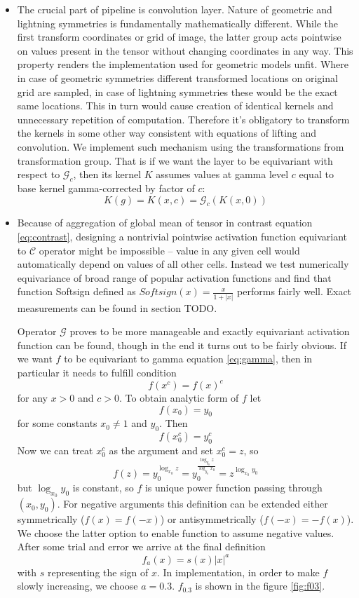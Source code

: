 \begin{itemize}
\item
The crucial part of pipeline is convolution layer. Nature of geometric
and lightning symmetries is fundamentally mathematically different. While
the first
transform coordinates or grid of image, the latter group acts pointwise on
values present in the tensor without changing coordinates in any way.
This property renders the implementation used for geometric models unfit.
Where in case of geometric symmetries different transformed locations
on original grid are sampled, in case of lightning symmetries these would be the
exact same locations. This in turn would cause creation of identical kernels and
unnecessary repetition of computation. Therefore it's obligatory to transform the
kernels in some other way consistent with equations of lifting and convolution.
We implement such mechanism using the transformations from transformation group.
That is if we want the layer to be equivariant with respect to
$\mathcal{G}_c$, then its kernel $K$ assumes values at gamma level $c$ equal to
base kernel gamma-corrected by factor of $c$:
\begin{equation}
    K(g) = K(x,c) = \mathcal{G}_c(K(x,0))
\end{equation}

\item Because of aggregation of global mean of tensor in contrast equation \ref{eq:contrast},
    designing a nontrivial pointwise activation function equivariant to
    $\mathcal{C}$ operator
    might be impossible -- value in any given cell would automatically depend on
    values of all other cells. Instead we test numerically equivariance of broad
    range of popular activation functions and find that function Softsign
    defined as $\mathit{Softsign}(x) = \frac{x}{1+|x|}$ performs fairly well.
    Exact measurements can be found in section TODO.

    Operator $\mathcal{G}$ proves to be more manageable and exactly equivariant
    activation function can be found, though in the end it turns out to be
    fairly obvious. If we want $f$ to be equivariant to gamma equation \ref{eq:gamma}, then in
    particular it needs to fulfill condition $$f\left(x^c\right) =
    f\left(x\right)^c$$
    for any $x>0$ and
    $c > 0$. To obtain analytic form of $f$
    let $$f(x_0)=y_0$$ for some constants $x_0 \neq 1$ and $y_0$.
    Then $$f\left(x_0^c\right) = y_0^c$$ Now we can treat $x_0^c$ as the argument and set
    $x_0^c = z$, so $$f(z) = y_0^{\log_{x_0}z} =
    y_0^\frac{\log_{y_0}z}{\log_{y_0}{x_0}} = z^{\log_{x_0}{y_0}}$$
    but $\log_{x_0}{y_0}$ is constant, so $f$ is unique power function passing
    through $\left(x_0, y_0\right)$. For negative arguments this definition can
    be extended either symmetrically ($f(x)=f(-x)$) or antisymmetrically ($f(-x)
    = -f(x)$). We choose the latter option to enable function to assume negative
    values.
    After some trial and error we arrive at the final definition $$f_a(x)
    = s(x)|x|^a$$ with $s$ representing the sign of $x$.
    In implementation, in order to make $f$ slowly increasing, we
    choose $a=0.3$. $f_{0.3}$ is shown in the figure \ref{fig:f03}.


\end{itemize}
